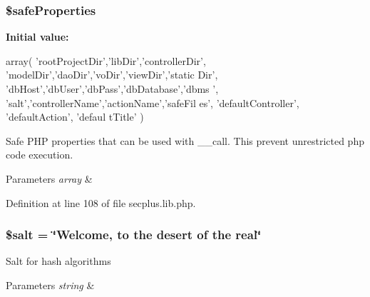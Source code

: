 \hypertarget{class_sec_plus_1_1_config_a97f8a8348db15caa1795c40f12f75847}{
\subsubsection[{\$safeProperties}]{\setlength{\rightskip}{0pt plus 5cm}\$safeProperties}}
\label{class_sec_plus_1_1_config_a97f8a8348db15caa1795c40f12f75847}
{\bfseries Initial value:}
\begin{DoxyCode}
 array(
                                    'rootProjectDir','libDir','controllerDir',
                                    'modelDir','daoDir','voDir','viewDir','static
      Dir',
                                    'dbHost','dbUser','dbPass','dbDatabase','dbms
      ',
                                    'salt','controllerName','actionName','safeFil
      es',
                                    'defaultController', 'defaultAction', 'defaul
      tTitle'
                                    )
\end{DoxyCode}
Safe PHP properties that can be used with \_\-\_\-call. This prevent unrestricted php code execution. 
\begin{DoxyParams}{Parameters}
{\em array} & \\
\hline
\end{DoxyParams}


Definition at line 108 of file secplus.lib.php.

\hypertarget{class_sec_plus_1_1_config_adc4dc6ee2d56ad844a1ccd6be7cd5af5}{
\subsubsection[{\$salt}]{\setlength{\rightskip}{0pt plus 5cm}\$salt = \char`\"{}Welcome, to the desert of the real\char`\"{}}}
\label{class_sec_plus_1_1_config_adc4dc6ee2d56ad844a1ccd6be7cd5af5}
Salt for hash algorithms 
\begin{DoxyParams}{Parameters}
{\em string} & \\
\hline
\end{DoxyParams}



